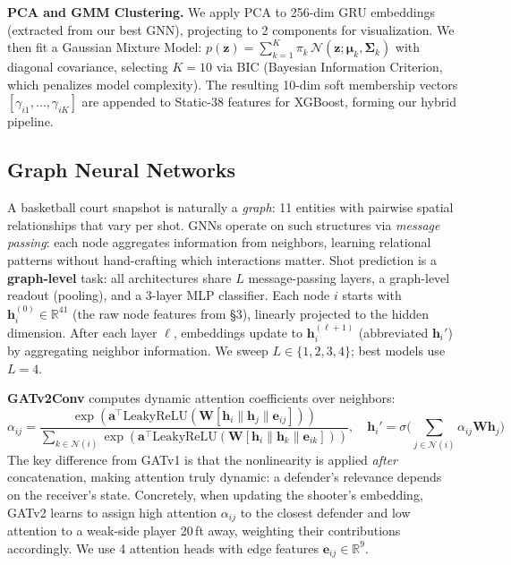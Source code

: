 \documentclass{article}
\begin{document}
\textbf{PCA and GMM Clustering.}
We apply PCA to 256-dim GRU embeddings (extracted from our best GNN), projecting to 2 components for visualization. We then fit a Gaussian Mixture Model: $p(\mathbf{z}) = \sum_{k=1}^K \pi_k \,\mathcal{N}(\mathbf{z};\boldsymbol{\mu}_k, \boldsymbol{\Sigma}_k)$ with diagonal covariance, selecting $K\!=\!10$ via BIC (Bayesian Information Criterion, which penalizes model complexity). The resulting 10-dim soft membership vectors $[\gamma_{i1}, \ldots, \gamma_{iK}]$ are appended to Static-38 features for XGBoost, forming our hybrid pipeline.

\subsection{Graph Neural Networks}
\label{sec:gnn_arch}

A basketball court snapshot is naturally a \emph{graph}: 11 entities with pairwise spatial relationships that vary per shot. GNNs operate on such structures via \emph{message passing}: each node aggregates information from neighbors, learning relational patterns without hand-crafting which interactions matter. Shot prediction is a \textbf{graph-level} task: all architectures share $L$ message-passing layers, a graph-level readout (pooling), and a 3-layer MLP classifier. Each node $i$ starts with $\mathbf{h}_i^{(0)} \in \mathbb{R}^{41}$ (the raw node features from \S3), linearly projected to the hidden dimension. After each layer $\ell$, embeddings update to $\mathbf{h}_i^{(\ell+1)}$ (abbreviated $\mathbf{h}_i'$) by aggregating neighbor information. We sweep $L \in \{1,2,3,4\}$; best models use $L\!=\!4$.

\textbf{GATv2Conv} \citep{brody2022gatv2} computes dynamic attention coefficients over neighbors:
\begin{equation}
\textstyle \alpha_{ij} = \frac{\exp(\mathbf{a}^\top \text{LeakyReLU}(\mathbf{W}[\mathbf{h}_i \| \mathbf{h}_j \| \mathbf{e}_{ij}]))}{\sum_{k \in \mathcal{N}(i)} \exp(\mathbf{a}^\top \text{LeakyReLU}(\mathbf{W}[\mathbf{h}_i \| \mathbf{h}_k \| \mathbf{e}_{ik}]))}, \quad
\mathbf{h}_i' = \sigma\!\Big(\textstyle\sum_{j \in \mathcal{N}(i)} \alpha_{ij} \mathbf{W}\mathbf{h}_j\Big)
\label{eq:gatv2}
\end{equation}
The key difference from GATv1 is that the nonlinearity is applied \emph{after} concatenation, making attention truly dynamic: a defender's relevance depends on the receiver's state. Concretely, when updating the shooter's embedding, GATv2 learns to assign high attention $\alpha_{ij}$ to the closest defender and low attention to a weak-side player 20\,ft away, weighting their contributions accordingly. We use 4 attention heads with edge features $\mathbf{e}_{ij} \in \mathbb{R}^9$.
\end{document}
